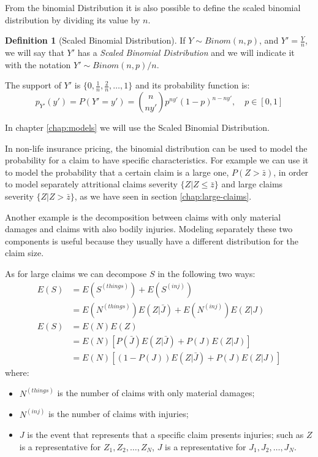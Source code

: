 \documentclass[a4paper, nobind]{templates/ociamthesis}
\providecommand{\tightlist}{%
  \setlength{\itemsep}{0pt}\setlength{\parskip}{0pt}}
\theoremstyle{definition}
\newtheorem{definition}{Definition}[chapter]
\theoremstyle{definition}
\theoremstyle{definition}
\theoremstyle{remark}
\begin{document}
From the binomial Distribution it is also possible to define the scaled binomial distribution by dividing its value by \(n\).

\begin{definition}[Scaled Binomial Distribution]
\label{def:def-scaled-binomial} \iffalse (Scaled Binomial Distribution) \fi{} If \(Y\sim Binom(n, p)\), and \(Y' = \frac{Y}{n}\), we will say that \(Y'\) has a \textit{Scaled Binomial Distribution} and we will indicate it with the notation \(Y' \sim Binom(n, p)/n\).

The support of \(Y'\) is \(\{0, \frac{1}{n}, \frac{2}{n}, \dots, 1 \}\) and its probability function is:
\[
p_{Y'}(y') = P\left( Y' = y' \right) = \binom{n}{ny'} p^{ny'} (1-p)^{n-ny'}, \quad p \in [0, 1]
\]
\end{definition}

In chapter \ref{chap:models} we will use the Scaled Binomial Distribution.

In non-life insurance pricing, the binomial distribution can be used to model the probability for a claim to have specific characteristics. For example we can use it to model the probability that a certain claim is a large one, \(P(Z>\bar{z})\), in order to model separately attritional claims severity \(\{Z|Z\le\bar{z}\}\) and large claims severity \(\{Z|Z>\bar{z}\}\), as we have seen in section \ref{chap:large-claims}.

Another example is the decomposition between claims with only material damages and claims with also bodily injuries. Modeling separately these two components is useful because they usually have a different distribution for the claim size.

As for large claims we can decompose \(S\) in the following two ways:
\begin{align}
  \nonumber
  E(S) & = E(S^{(things)}) + E(S^{(inj)}) \\
    \label{inj-claim-decomposition-expected-1}
    & = E(N^{(things)}) E(Z|\bar{J}) + E(N^{(inj)}) E(Z|J) \\[12pt]
  \nonumber
  E(S) & = E(N) E(Z) \\
    \nonumber
    & = E(N) \left[P(\bar{J}) E(Z|\bar{J}) + P(J) E(Z|J) \right] \\
    \label{inj-claim-decomposition-expected-2}
    & = E(N) \left[\left( 1 - P(J) \right) E(Z|\bar{J}) + P(J) E(Z|J)\right]
\end{align}
where:

\begin{itemize}
\tightlist
\item
  \(N^{(things)}\) is the number of claims with only material damages;
\item
  \(N^{(inj)}\) is the number of claims with injuries;
\item
  \(J\) is the event that represents that a specific claim presents injuries; such as \(Z\) is a representative for \(Z_1, Z_2, \dots, Z_N\), \(J\) is a representative for \(J_1, J_2, \dots, J_N\).
\end{itemize}
\end{document}
